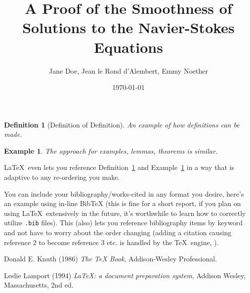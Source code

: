 \documentclass[11pt]{article}
\author{Jane Doe, Jean le Rond d'Alembert, Emmy Noether}
\date{\today}
\title{A Proof of the Smoothness of Solutions to the Navier-Stokes 
Equations}
\newtheorem{definition}{Definition}
\newtheorem{example}{Example}
\begin{document}
\maketitle


\lipsum[1]

\begin{definition}[Definition of Definition]
An example of how definitions can be made. \label{myDefinition}
\end{definition}

\lipsum[1]

\begin{example}
The approach for examples, lemmas, theorems is similar.\label{myExample}
\end{example}

\LaTeX~even lets you reference Definition~\ref{myDefinition} and 
Example~\ref{myExample} in a way that is adaptive to any re-ordering you 
make.


You can include your bibliography/works-cited in any format you desire, 
here's an example using in-line BibTeX (this is fine for a short report, if 
you plan on using \LaTeX~extensively in the future, it's worthwhile to learn 
how to correctly utilize \texttt{.bib} files). This (also) lets you 
reference bibliography items by keyword and not have to worry about the 
order changing (adding a citation causing reference 2 to become reference 3 
etc. is handled by the \TeX~engine, \cite{texbook}).

\begin{thebibliography}{9}
Donald E. Knuth (1986) \emph{The \TeX{} Book}, Addison-Wesley Professional.

Leslie Lamport (1994) \emph{\LaTeX: a document preparation system}, Addison
Wesley, Massachusetts, 2nd ed.
\end{thebibliography}
\end{document}
